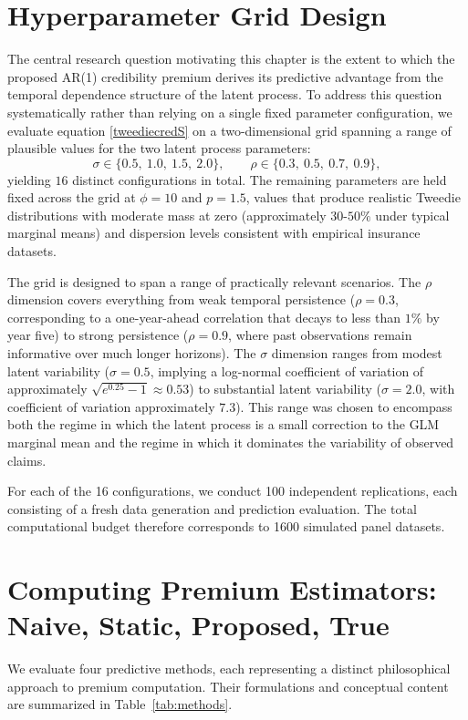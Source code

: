\documentclass{sfuthesis}
\numberwithin{equation}{chapter}
\begin{document}
\section{Hyperparameter Grid Design}
\label{subsec:grid}

The central research question motivating this chapter is the extent to which the proposed AR(1) credibility premium derives its predictive advantage from the temporal dependence structure of the latent process. To address this question systematically rather than relying on a single fixed parameter configuration, we evaluate equation \eqref{tweediecredS} on a two-dimensional grid spanning a range of plausible values for the two latent process parameters:
\begin{equation}
\sigma \in \{0.5,\ 1.0,\ 1.5,\ 2.0\}, \qquad \rho \in \{0.3,\ 0.5,\ 0.7,\ 0.9\},
\label{eq:grid}
\end{equation}
yielding $16$ distinct configurations in total. The remaining parameters are held fixed across the grid at $\phi = 10$ and $p = 1.5$, values that produce realistic Tweedie distributions with moderate mass at zero (approximately $30$-$50\%$ under typical marginal means) and dispersion levels consistent with empirical insurance datasets.

The grid is designed to span a range of practically relevant scenarios. The $\rho$ dimension covers everything from weak temporal persistence ($\rho = 0.3$, corresponding to a one-year-ahead correlation that decays to less than $1\%$ by year five) to strong persistence ($\rho = 0.9$, where past observations remain informative over much longer horizons). The $\sigma$ dimension ranges from modest latent variability ($\sigma = 0.5$, implying a log-normal coefficient of variation of approximately $\sqrt{e^{0.25} - 1} \approx 0.53$) to substantial latent variability ($\sigma = 2.0$, with coefficient of variation approximately $7.3$). This range was chosen to encompass both the regime in which the latent process is a small correction to the GLM marginal mean and the regime in which it dominates the variability of observed claims.

For each of the 16 configurations, we conduct 100 independent replications, each consisting of a fresh data generation and prediction evaluation. The total computational budget therefore corresponds to 1600 simulated panel datasets. 

\section{Computing Premium Estimators: Naive, Static, Proposed, True}
\label{subsec:premium_methods}
We evaluate four predictive methods, each representing a distinct philosophical approach to premium computation. Their formulations and conceptual content are summarized in Table~\ref{tab:methods}.
\end{document}
